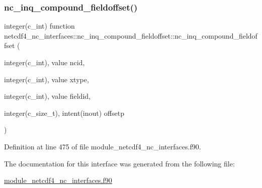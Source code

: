 \subsubsection{\texorpdfstring{nc\+\_\+inq\+\_\+compound\+\_\+fieldoffset()}{nc\_inq\_compound\_fieldoffset()}}
{\footnotesize\ttfamily integer(c\+\_\+int) function netcdf4\+\_\+nc\+\_\+interfaces\+::nc\+\_\+inq\+\_\+compound\+\_\+fieldoffset\+::nc\+\_\+inq\+\_\+compound\+\_\+fieldoffset (\begin{DoxyParamCaption}\item[{integer(c\+\_\+int), value}]{ncid,  }\item[{integer(c\+\_\+int), value}]{xtype,  }\item[{integer(c\+\_\+int), value}]{fieldid,  }\item[{integer(c\+\_\+size\+\_\+t), intent(inout)}]{offsetp }\end{DoxyParamCaption})}



Definition at line 475 of file module\+\_\+netcdf4\+\_\+nc\+\_\+interfaces.\+f90.



The documentation for this interface was generated from the following file\+:\begin{DoxyCompactItemize}
\item 
\hyperlink{module__netcdf4__nc__interfaces_8f90}{module\+\_\+netcdf4\+\_\+nc\+\_\+interfaces.\+f90}\end{DoxyCompactItemize}
